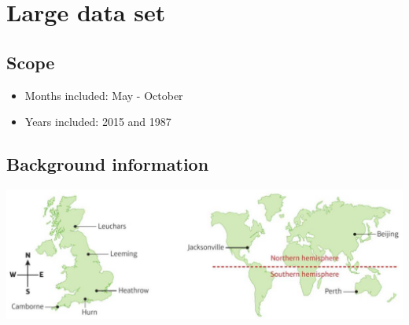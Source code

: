 \documentclass[oneside,fleqn,11pt]{book}
\begin{document}
	\section{Large data set}
	\subsection{Scope}
	\begin{itemize}
		\item Months included: May - October
		\item Years included: 2015 and 1987
	\end{itemize}
	\subsection{Background information}
	\includegraphics{LDSmap}\\
\end{document}
